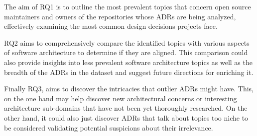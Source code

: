         The aim of RQ1 is to outline the most prevalent topics that concern open source maintainers and owners of the repositories whose ADRs are being analyzed, effectively examining the most common design decisions projects face.
        
        RQ2 aims to comprehensively compare the identified topics with various aspects of software architecture to determine if they are aligned. This comparison could also provide insights into less prevalent software architecture topics as well as the breadth of the ADRs in the dataset and suggest future directions for enriching it.
        
        Finally RQ3, aims to discover the intricacies that outlier ADRs might have. This, on the one hand may help discover new architectural concerns or interesting architecture sub-domains that have not been yet thoroughly researched. On the other hand, it could also just discover ADRs that talk about topics too niche to be considered validating potential suspicions about their irrelevance.

